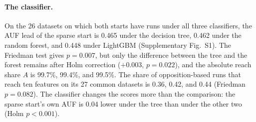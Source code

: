 \paragraph{The classifier.} On the 26 datasets on which both starts have runs under all three classifiers, the AUF lead of the sparse start is 0.465 under the decision tree, 0.462 under the random forest, and 0.448 under LightGBM (Supplementary Fig.~S1). The Friedman test gives $p = 0.007$, but only the difference between the tree and the forest remains after Holm correction ($+0.003$, $p = 0.022$), and the absolute reach share $A$ is 99.7\%, 99.4\%, and 99.5\%. The share of opposition-based runs that reach ten features on its 27 common datasets is 0.36, 0.42, and 0.44 (Friedman $p = 0.082$). The classifier changes the scores more than the comparison: the sparse start's own AUF is 0.04 lower under the tree than under the other two (Holm $p < 0.001$).
